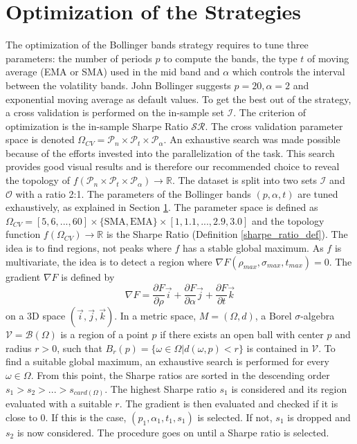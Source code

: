 \documentclass[11pt,a4,twosided,singlespacing,titlepagenumber=on]{scrreprt}
\numberwithin{equation}{chapter} %
\theoremstyle{remark}
\begin{document}
\section{Optimization of the Strategies}
\label{sec:optimization_strategy}
The optimization of the Bollinger bands strategy requires to tune three parameters: the number of periods $p$ to compute the bands, the type $t$ of moving average (EMA or SMA) used in the mid band and $\alpha$ which controls the interval between the volatility bands. John Bollinger suggests $p = 20, \alpha = 2$ and exponential moving average as default values. To get the best out of the strategy, a cross validation is performed on the in-sample set $\mathcal{I}$. The criterion of optimization is the in-sample Sharpe Ratio $\mathcal{SR}$. The cross validation parameter space is denoted  $\Omega_{CV} = \mathcal{P}_n \times \mathcal{P}_t \times \mathcal{P}_\alpha$. An exhaustive search was made possible because of the efforts invested into the parallelization of the task. This search provides good visual results and is therefore our recommended choice to reveal the topology of $f(\mathcal{P}_n \times \mathcal{P}_t \times \mathcal{P}_\alpha) \rightarrow \mathbb{R}$. The dataset is split into two sets $\mathcal{I}$ and $\mathcal{O}$ with a ratio 2:1. The parameters of the Bollinger bands $(p, \alpha, t)$ are tuned exhaustively, as explained in Section \ref{sec:optimization_strategy}. The parameter space is defined as $\Omega_{CV}  = [5,6,...,60] \times \{\text{SMA}, \text{EMA}\} \times [1,1.1,...,2.9,3.0]$ and the topology function $f(\Omega_{CV}) \rightarrow \mathbb{R}$ is the Sharpe Ratio (Definition \ref{sharpe_ratio_def}). The idea is to find regions, not peaks where $f$ has a stable global maximum. As $f$ is multivariate, the idea is to detect a region where $\nabla F(\rho_{max}, \sigma_{max}, t_{max}) = 0$. The gradient $\nabla F$ is defined by
\begin{equation}
\nabla F = \frac{\partial F}{\partial \rho} \vec{i} + \frac{\partial F}{\partial \alpha} \vec{j} + \frac{\partial F}{\partial t} \vec{k}
\end{equation}
on a 3D space $(\vec{i}, \vec{j}, \vec{k})$. In a metric space, $M = (\Omega, d)$, a Borel $\sigma$-algebra $\mathcal{V} = \mathcal{B}(\Omega)$ is a region of a point $p$ if there exists an open ball with center $p$ and radius $r > 0$, such that $B_r(p) = \{\omega \in \Omega | d(\omega, p) < r\}$ is contained in $\mathcal{V}$. To find a suitable global maximum, an exhaustive search is performed for every $\omega \in \Omega$. From this point, the Sharpe ratios are sorted in the descending order $s_1 > s_2 > ... > s_{card(\Omega)}$. The highest Sharpe ratio $s_1$ is considered and its region evaluated with a suitable $r$. The gradient is then evaluated and checked if it is close to 0. If this is the case, $(p_1, \alpha_1, t_1, s_1)$ is selected. If not, $s_1$ is dropped and $s_2$ is now considered. The procedure goes on until a Sharpe ratio is selected.
 
\end{document}
